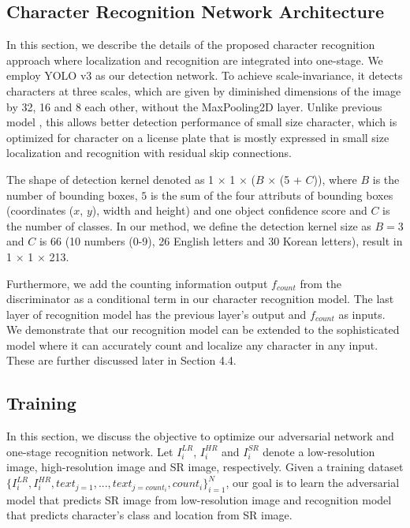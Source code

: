 \documentclass[a4paper,twoside]{article}
\begin{document}
\subsection{Character Recognition Network Architecture}
     In this section, we describe the details of the proposed character recognition approach where localization and recognition are integrated into one-stage. We employ YOLO v3 \cite{redmon2018yolov3} as our detection network. To achieve scale-invariance, it detects characters at three scales, which are given by diminished dimensions of the image by 32, 16 and 8 each other, without the MaxPooling2D layer. Unlike previous model \cite{redmon2017yolo9000}, this allows better detection performance of small size character, which is optimized for character on a license plate that is mostly expressed in small size localization and recognition with residual skip connections. 
     
     The shape of detection kernel denoted as 1 $\times$ 1 $\times$ ($B$ $\times$ (5 + $C$)), where $B$ is the number of bounding boxes, $5$ is the sum of the four attributs of bounding boxes (coordinates ($x$, $y$), width and height) and one object confidence score and $C$ is the number of classes. In our method, we define the detection kernel size as $B = 3$ and $C$ is 66 (10 numbers (0-9), 26 English letters and 30 Korean letters), result in 1 $\times$ 1 $\times$ 213.  
     
     Furthermore, we add the counting information output $f_{count}$ from the discriminator as a conditional term in our character recognition model. The last layer of recognition model has the previous layer's output and $f_{count}$ as inputs. We demonstrate that our recognition model can be extended to the sophisticated model where it can accurately count and localize any character in any input. These are further discussed later in Section 4.4.
    
\subsection{Training}
    In this section, we discuss the objective to optimize our adversarial network and one-stage recognition network. Let $I_i^{LR}$, $I_i^{HR}$ and $I_i^{SR}$ denote a low-resolution image, high-resolution image and SR image, respectively. Given a training dataset $\{I_i^{LR}, I_i^{HR}, text_{j=1}, ..., text_{j=count_i}, count_i\}_{i=1}^{N}$, our goal is to learn the adversarial model that predicts SR image from low-resolution image and recognition model that predicts character's class and location from SR image.
    
\end{document}
